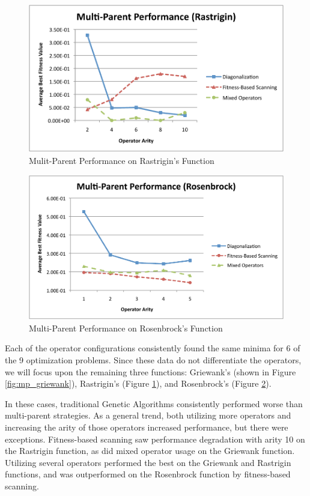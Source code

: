 \begin{figure}[htbp!]
\centering
\includegraphics[scale=0.70]{charts/MP_Rastrigin.pdf}
\caption{Mulit-Parent Performance on Rastrigin's Function}
\label{fig:mp_rastrigin}
\end{figure}

\begin{figure}[htbp!]
\centering
\includegraphics[scale=0.70]{charts/MP_Rosenbrock.pdf}
\caption{Multi-Parent Performance on Rosenbrock's Function}
\label{fig:mp_rosenbrock}
\end{figure}

Each of the operator configurations consistently found the same minima for 6 of the 9 optimization problems. Since these data do not differentiate the operators, we will focus upon the remaining three functions:  Griewank's (shown in Figure \ref{fig:mp_griewank}), Rastrigin's (Figure \ref{fig:mp_rastrigin}), and Rosenbrock's (Figure \ref{fig:mp_rosenbrock}).

In these cases, traditional Genetic Algorithms consistently performed worse than multi-parent strategies. As a general trend, both utilizing more operators and increasing the arity of those operators increased performance, but there were exceptions. Fitness-based scanning saw performance degradation with arity 10 on the Rastrigin function, as did mixed operator usage on the Griewank function. Utilizing several operators performed the best on the Griewank and Rastrigin functions, and was outperformed on the Rosenbrock function by fitness-based scanning.

